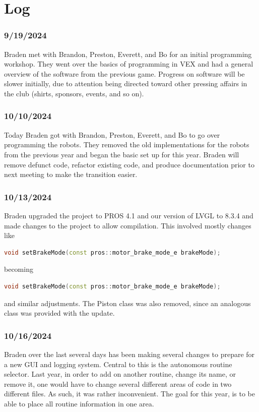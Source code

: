 \chapter{Log}
\subsection{9/19/2024}
Braden met with Brandon, Preston, Everett, and Bo for an initial programming workshop. They went over the basics of programming in VEX and had a general overview of the software from the previous game. Progress on software will be slower initially, due to attention being directed toward other pressing affairs in the club (shirts, sponsors, events, and so on). 

\subsection{10/10/2024}
Today Braden got with Brandon, Preston, Everett, and Bo to go over programming the robots. They removed the old implementations for the robots from the previous year and began the basic set up for this year. Braden will remove defunct code, refactor existing code, and produce documentation prior to next meeting to make the transition easier.

\subsection{10/13/2024}
Braden upgraded the project to PROS 4.1 and our version of LVGL to 8.3.4 and made changes to the project to allow compilation. 
This involved mostly changes like
\begin{lstlisting}[language=C++]
    void setBrakeMode(const pros::motor_brake_mode_e brakeMode);
\end{lstlisting}
becoming
\begin{lstlisting}[language=C++]
    void setBrakeMode(const pros::motor_brake_mode_e brakeMode);
\end{lstlisting}
and similar adjustments. The Piston class was also removed, since an analogous class was provided with the update. 

\subsection{10/16/2024}
Braden over the last several days has been making several changes to prepare for a new GUI and logging system. Central to this is the autonomous routine selector. Last year, in order to add on another routine, change its name, or remove it, one would have to change several different areas of code in two different files. As such, it was rather inconvenient. The goal for this year, is to be able to place all routine information in one area.

